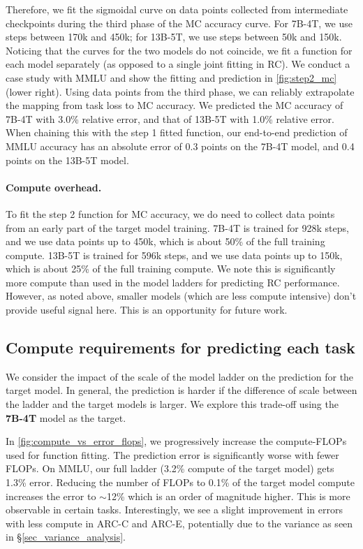 Therefore, we fit the sigmoidal curve on data points collected from intermediate checkpoints during the third phase of the MC accuracy curve.
For 7B-4T, we use steps between 170k and 450k; for 13B-5T, we use steps between 50k and 150k.
Noticing that the curves for the two models do not coincide, we fit a function for each model separately (as opposed to a single joint fitting in RC).
We conduct a case study with MMLU and show the fitting and prediction in \autoref{fig:step2_mc} (lower right).
Using data points from the third phase, we can reliably extrapolate the mapping from task loss to MC accuracy.
We predicted the MC accuracy of 7B-4T with 3.0\% relative error, and that of 13B-5T with 1.0\% relative error.
When chaining this with the step 1 fitted function, our end-to-end prediction of MMLU accuracy has an absolute error of 0.3 points on the 7B-4T model, and 0.4 points on the 13B-5T model.

\paragraph{Compute overhead.}
To fit the step 2 function for MC accuracy, we do need to collect data points from an early part of the target model training.
7B-4T is trained for 928k steps, and we use data points up to 450k, which is about 50\% of the full training compute.
13B-5T is trained for 596k steps, and we use data points up to 150k, which is about 25\% of the full training compute.
We note this is significantly more compute than used in the model ladders for predicting RC performance. However, as noted above, smaller models (which are less compute intensive) don't provide useful signal here. This is an opportunity for future work.





\subsection{Compute requirements for predicting each task}
\label{app:ablate_compute}

We consider the impact of the scale of the model ladder on the prediction for the target model. In general, the prediction is harder if the difference of scale between the ladder and the target models is larger. We explore this trade-off using the \textbf{7B-4T} model as the target. 

In \autoref{fig:compute_vs_error_flops}, we progressively increase the compute-FLOPs used for function fitting. 
 The prediction error is significantly worse with fewer FLOPs. On MMLU, our full ladder (3.2\% compute of the target model) gets 1.3\% error. Reducing the number of FLOPs to 0.1\% of the target model compute increases the error to $\sim$12\% which is an order of magnitude higher. This is more observable in certain tasks. Interestingly, we see a slight improvement in errors with less compute in ARC-C and ARC-E, potentially due to the variance as seen in \S\ref{sec_variance_analysis}.


